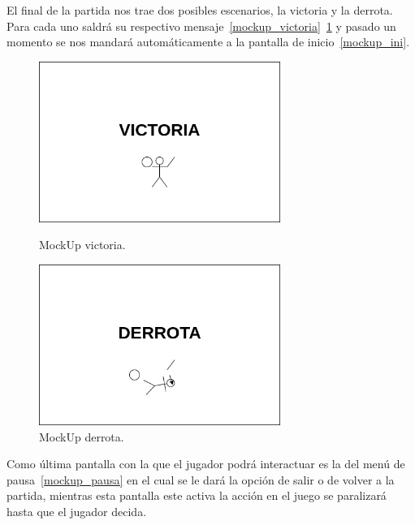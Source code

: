 El final de la partida nos trae dos posibles escenarios, la victoria y la derrota. 
Para cada uno saldrá su respectivo mensaje~\ref{mockup_victoria}~\ref{mockup_derrota}
y pasado un momento se nos mandará automáticamente a la pantalla de
inicio~\ref{mockup_ini}.

\begin{figure}[ht]
\centering
\begin{minipage}[c]{0.45\linewidth}
	\hspace{9mm}
	\includegraphics[width=0.7\textwidth]{imagenes/Pantalla_victoria.png}
	\caption{MockUp victoria.}
	\label{mockup_victoria}
\end{minipage}
\begin{minipage}[c]{0.45\linewidth}
	\hspace{9mm}
	\includegraphics[width=0.7\textwidth]{imagenes/Pantalla_derrota.png}
	\caption{MockUp derrota.}
	\label{mockup_derrota}
\end{minipage}	
\end{figure}

Como última pantalla con la que el jugador podrá interactuar es la del menú de
pausa~\ref{mockup_pausa} en el cual se le dará la opción de salir o de volver a la
partida, mientras esta pantalla este activa la acción en el juego se paralizará hasta
que el jugador decida. 


